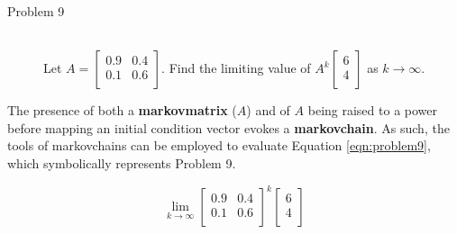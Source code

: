 \documentclass[titlepage]{article}
\begin{document}
\begin{prob}
    \begin{description}
        \item[Problem 9] \hfill \\ Let $
            A =
            \begin{bmatrix}
                0.9 & 0.4\\
                0.1 & 0.6\\
            \end{bmatrix}
        $. Find the limiting value of $
            A^k
            \begin{bmatrix}
                6\\
                4\\
            \end{bmatrix}
        $ as $k\to\infty$.
    \end{description}
\end{prob}

The presence of both a \textbf{\Gls{markovmatrix}} ($A$) and of $A$ being raised to a power before mapping an initial condition vector evokes a \textbf{\Gls{markovchain}}. As such, the tools of \Glspl{markovchain} can be employed to evaluate Equation \ref{eqn:problem9}, which symbolically represents Problem 9.

\begin{equation}\label{eqn:problem9}
    \lim_{k\to\infty}
    \begin{bmatrix}
        0.9 & 0.4\\
        0.1 & 0.6\\
    \end{bmatrix}^k
    \begin{bmatrix}
        6\\
        4\\
    \end{bmatrix}
\end{equation}
\end{document}
